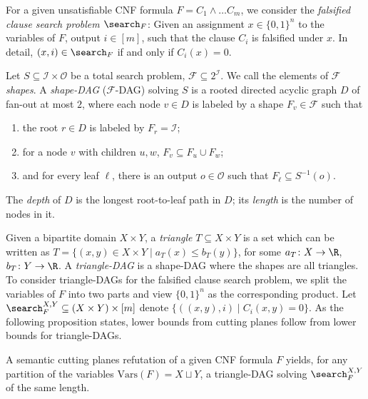 For a given unsatisfiable CNF formula $F= C_1\land \dots C_m$, we consider the \emph{falsified clause search problem $\search_{F}$}: Given an assignment $x\in \{0,1\}^n$ to the variables of $F$, output $i\in [m]$, such that the clause $C_i$ is falsified under $x$. In detail, $(x,i)\in \search_F$ if and only if $C_i(x)=0$. 

\begin{definition}
    Let $S\subseteq \mathcal{I}\times \mathcal{O}$ be a total search problem, $\mathcal{F}\subseteq 2^{\mathcal{I}}$. We call the elements of $\mathcal{F}$ \emph{shapes}.
    A \emph{shape-DAG} ($\mathcal{F}$-DAG) solving $S$ is a rooted directed acyclic graph $D$ of fan-out at most $2$, where each node $v\in D$ is labeled by a shape $F_v\in \mathcal{F}$ such that 
    \begin{enumerate}
        \item the root $r\in D$ is labeled by $F_r=\mathcal{I}$;
        \item for a node $v$ with children $u,w$, $F_v\subseteq F_u \cup F_w$; 
        \item and for every leaf $
        \ell$, there is an output $o \in \mathcal{O}$ such that $F_{\ell}\subseteq S^{-1}(o)$.
    \end{enumerate}
    The \emph{depth} of $D$ is the longest root-to-leaf path in $D$; its \emph{length} is the number of nodes in it.
\end{definition}

Given a bipartite domain $X\times Y$, a \emph{triangle} $T\subseteq X \times Y$ is a set which can be written as $T=\{(x,y)\in X\times Y \mid a_T(x)\leq b_T(y)\}$, for some $a_T\colon X \rightarrow \R$, $b_T\colon Y \rightarrow \R$. 
A \emph{triangle-DAG} is a shape-DAG where the shapes are all triangles. To consider triangle-DAGs for the falsified clause search problem, we split the variables of $F$ into two parts and view $\{0,1\}^n$ as the corresponding product. Let $\search_F^{X,Y}\subseteq (X\times Y) \times [m]$ denote $\{((x,y),i) \mid C_i(x,y)=0\}$.
As the following proposition states, lower bounds from cutting planes follow from lower bounds for triangle-DAGs.
\begin{proposition}\label{prop:CP-to-triangleDAG}
A semantic cutting planes refutation of a given CNF formula $F$ yields, for any partition of the variables $\textrm{Vars}(F)=X\sqcup Y$, a triangle-DAG solving $\search_F^{X,Y}$ of the same length.
\end{proposition}


